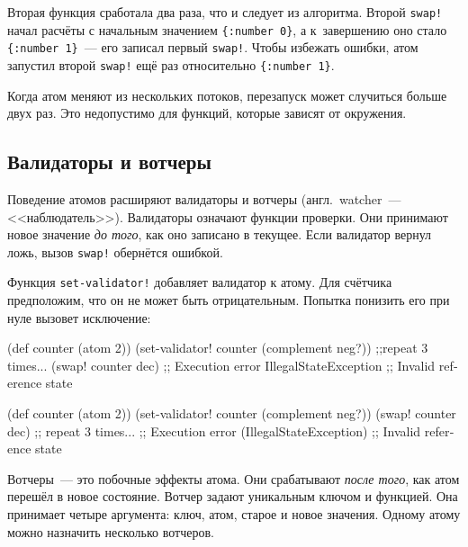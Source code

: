 Вторая функция сработала два раза, что и следует из алгоритма. Второй
\verb|swap!| начал расчёты с начальным значением \verb|{:number 0}|, а
к~завершению оно стало \verb|{:number 1}|~--- его записал первый
\verb|swap!|. Чтобы избежать ошибки, атом запустил второй \verb|swap!| ещё раз
относительно \verb|{:number 1}|.

Когда атом меняют из нескольких потоков, перезапуск может случиться больше двух
раз. Это недопустимо для функций, которые зависят от окружения.

\subsection{Валидаторы и вотчеры}


Поведение атомов расширяют валидаторы и вотчеры (англ.~watcher~--- <<наблюдатель>>).
Валидаторы означают функции проверки. Они принимают новое значение
\emph{до того}, как оно записано в текущее. Если валидатор вернул ложь, вызов
\verb|swap!| обернётся ошибкой.


Функция \verb|set-validator!| добавляет валидатор к атому. Для счётчика
предположим, что он не может быть отрицательным. Попытка понизить его при нуле
вызовет исключение:

\ifx\DEVICETYPE\MOBILE

\begin{english}
  \begin{clojure}
(def counter (atom 2))
(set-validator!
  counter (complement neg?))
;;repeat 3 times...
(swap! counter dec)
;; Execution error IllegalStateException
;; Invalid reference state
  \end{clojure}
\end{english}

\else

\begin{english}
  \begin{clojure}
(def counter (atom 2))
(set-validator! counter (complement neg?))
(swap! counter dec) ;; repeat 3 times...
;; Execution error (IllegalStateException)
;; Invalid reference state
  \end{clojure}
\end{english}

\fi

Вотчеры~--- это побочные эффекты атома. Они срабатывают \emph{после того}, как атом
перешёл в новое состояние. Вотчер задают уникальным ключом и функцией. Она
принимает четыре аргумента: ключ, атом, старое и новое значения. Одному атому
можно назначить несколько вотчеров.

